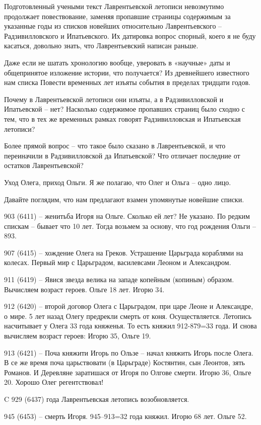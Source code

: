 Подготовленный учеными текст Лаврентьевской летописи невозмутимо продолжает повествование, заменяя пропавшие страницы содержимым за указанные годы из списков новейших относительно Лаврентьевского – Радзивилловского и Ипатьевского. Их датировка вопрос спорный, коего я не буду касаться, довольно знать, что Лаврентьевский написан раньше.

Даже если не шатать хронологию вообще, уверовать в «научные» даты и общепринятое изложение истории, что получается? Из древнейшего известного нам списка Повести временных лет изъяты события в пределах тридцати годов.

Почему в Лаврентьевской летописи они изъяты, а в Радзивилловской и Ипатьевской – нет? Насколько содержимое пропавших страниц было сходно с тем, что в тех же временных рамках говорят Радзивилловская и Ипатьевская летописи?

Более прямой вопрос – что такое было сказано в Лаврентьевской, и что переиначили в Радзивилловской да Ипатьевской? Что отличает последние от остатков Лаврентьевской?

Уход Олега, приход Ольги. Я же полагаю, что Олег и Ольга – одно лицо.

Давайте поглядим, что нам предлагают взамен упомянутые новейшие списки.

903 (6411) – женитьба Игоря на Ольге. Сколько ей лет? Не указано. По редким спискам – бывает что 10 лет. Тогда возьмем за основу, что год рождения Ольги – 893. 

907 (6415) – хождение Олега на Греков. Устрашение Царьграда кораблями на колесах. Первый мир с Царьградом, василевсами Леоном и Александром.

911 (6419) – Явися звезда велика на западе копейным (копиным) образом. Вычисляем возраст героев. Ольге 18 лет. Игорю 34.

912 (6420) – второй договор Олега с Царьградом, при царе Леоне и Александре, о мире. 5 лет назад Олегу предрекли смерть от коня. Осуществляется. Летопись насчитывает у Олега 33 года княженья. То есть княжил 912-879=33 года. И снова вычисляем возраст героев: Игорю 35, Ольге 19.

913 (6421) – Поча княжити Игорь по Ользе – начал княжить Игорь после Олега. В се же время поча царьствовати (в Царьграде) Костянтин, сын Леонтов, зять Романов. И Деревляне заратишася от Игоря по Олгове смерти. Игорю 36, Ольге 20. Хорошо Олег регентствовал!

C 929 (6437) года Лаврентьевская летопись возобновляется.

945 (6453) – смерть Игоря. 945–913=32 года княжил. Игорю 68 лет. Ольге 52.

